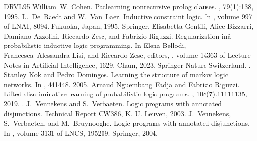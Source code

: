 \documentclass[letterpaper,10pt,english]{sphinxmanual}
\begin{document}
\begin{sphinxthebibliography}{DRVL95}
\sphinxAtStartPar
William W. Cohen. Pac\sphinxhyphen{}learning non\sphinxhyphen{}recursive prolog clauses. , 79(1):1\textendash{}38, 1995.
\sphinxAtStartPar
L. De Raedt and W. Van Laer. Inductive constraint logic. In , volume 997 of LNAI, 80\textendash{}94. Fukuoka, Japan, 1995. Springer.
\sphinxAtStartPar
Elisabetta Gentili, Alice Bizzarri, Damiano Azzolini, Riccardo Zese, and Fabrizio Riguzzi. Regularization inâ probabilistic inductive logic programming. In Elena Bellodi, Francesca Alessandra Lisi, and Riccardo Zese, editors, , volume 14363 of Lecture Notes in Artificial Intelligence, 16\textendash{}29. Cham, 2023. Springer Nature Switzerland. .
\sphinxAtStartPar
Stanley Kok and Pedro Domingos. Learning the structure of markov logic networks. In , 441\textendash{}448. 2005.
\sphinxAtStartPar
Arnaud Nguembang Fadja and Fabrizio Riguzzi. Lifted discriminative learning of probabilistic logic programs. , 108(7):1111\textendash{}1135, 2019. .
\sphinxAtStartPar
J. Vennekens and S. Verbaeten. Logic programs with annotated disjunctions. Technical Report CW386, K. U. Leuven, 2003.
\sphinxAtStartPar
J. Vennekens, S. Verbaeten, and M. Bruynooghe. Logic programs with annotated disjunctions. In , volume 3131 of LNCS, 195\textendash{}209. Springer, 2004.
\end{sphinxthebibliography}



\renewcommand{\indexname}{Index}
\printindex
\end{document}
